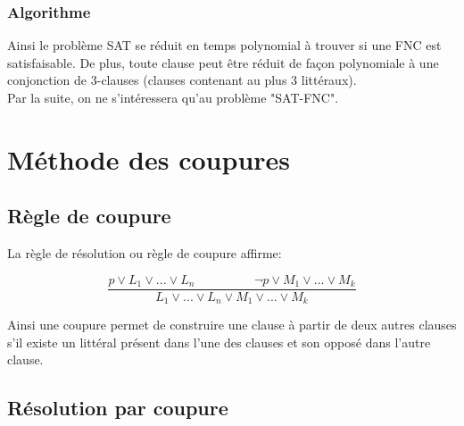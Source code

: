 \documentclass[12pt]{extarticle}
\begin{document}
\subsubsection*{Algorithme}
\begin{algorithm}[H]
\end{algorithm}
\vspace{2em}

Ainsi le problème SAT se réduit en temps polynomial à trouver si une FNC est satisfaisable.
De plus, toute clause peut être réduit de façon polynomiale à une conjonction de 3-clauses (clauses contenant au plus 3 littéraux). \\

Par la suite, on ne s'intéressera qu'au problème "SAT-FNC".

\newpage
\section{Méthode des coupures}

\subsection{Règle de coupure}

La règle de résolution ou règle de coupure affirme:

$$\frac{p \lor L_1 \lor ... \lor L_n\hspace{2cm}\lnot{p} \lor M_1 \lor ... \lor M_k}{L_1 \lor ... \lor L_n \lor M_1 \lor ... \lor M_k}$$

Ainsi une coupure permet de construire une clause à partir de deux autres clauses s'il existe un littéral présent dans l'une des clauses et son opposé dans l'autre clause.

\subsection{Résolution par coupure}
\end{document}
